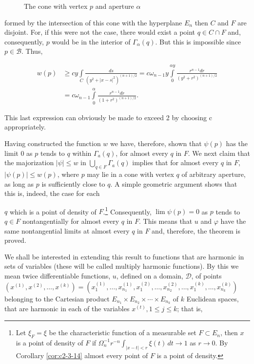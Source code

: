 \begin{figure}[htbp]
\centering
\figcone
\caption{The cone with vertex $p$ and aperture $\alpha$}
\label{fig:c2-p78}
\end{figure}

formed by the intersection of this cone with the hyperplane $E_n$ then $C$ and $F$ are disjoint. For, if this were not the case, there would exist a point $q \in C \cap F$ and, consequently, $p$ would be in the interior of $\Gamma_\alpha(q)$. But this is impossible since $p \in \mathcal{B}$. Thus,

\[
\begin{aligned}w(p)&\geq cy\int\limits_{C}\frac{ds}{(y^{2}+|x-s|^{2})^{(n+1)/2}}=c\omega_{n-1}y\int\limits_{0}^{\alpha y}\frac{r^{n-1}dr}{(y^{2}+r^{2})^{(n+1)/2}}\\&=c\omega_{n-1}\int\limits_{0}^{\alpha}\frac{r^{n-1}dr}{(1+r^{2})^{(n+1)/2}}.\end{aligned}
\]

This last expression can obviously be made to exceed 2 by choosing c appropriately.

Having constructed the function $w$ we have, therefore, shown that $\psi(p)$ has the limit $0$ as $p$ tends to $q$ within $\Gamma_a(q)$, for almost every $q$ in $F$. We next claim that the majorization $|\psi| \leq w$ in $\bigcup_{q\in F} \Gamma_a(q)$ implies that for almost every $q$ in $F$, $|\psi(p)| \leq w(p)$, where $p$ may lie in a cone with vertex $q$ of arbitrary aperture, as long as $p$ is sufficiently close to $q$. A simple geometric argument shows that this is, indeed, the case for each

$q$ which is a point of density of $F$.\footnote{Let $\xi_F = \xi$ be the characteristic function of a measurable set $F \subset E_n$, then $x$ is a point of density of $F$ if $\Omega_n^{-1} r^{-n} \int_{|x-t| < r} \xi(t) \, dt \to 1$ as $r \to 0$. By Corollary \ref{cor:c2-3-14} almost every point of $F$ is a point of density.} Consequently, $\lim \psi(p) = 0$ as $p$ tends to $q \in F$ nontangentially for almost every $q$ in $F$. This means that $u$ and $\varphi$ have the same nontangential limits at almost every $q$ in $F$ and, therefore, the theorem is proved.

We shall be interested in extending this result to functions that are harmonic in sets of variables (these will be called multiply harmonic functions). By this we mean twice differentiable functions, $u$, defined on a domain, $\mathcal{D}$, of points $(x^{(1)}, x^{(2)}, \ldots, x^{(k)}) = (x_1^{(1)}, \ldots, x_{n_1}^{(1)}, x_1^{(2)}, \ldots, x_{n_2}^{(2)}, \ldots, x_1^{(k)}, \ldots, x_{n_k}^{(k)})$ belonging to the Cartesian product $E_{n_1} \times E_{n_2} \times \cdots \times E_{n_k}$ of $k$ Euclidean spaces, that are harmonic in each of the variables $x^{(t)}, 1 \leq j \leq k$; that is,

